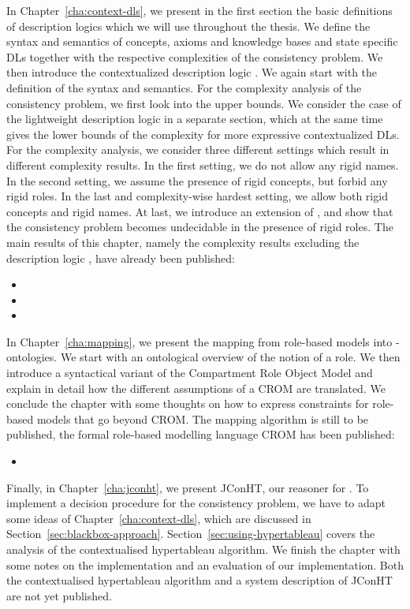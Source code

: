 In Chapter~\ref{cha:context-dls}, we present in the first section the basic definitions of
description logics which we will use throughout the thesis. We define the syntax and semantics of
concepts, axioms and knowledge bases and state specific DLs together with the respective
complexities of the consistency problem.
%
We then introduce the contextualized description logic \LMLO. We again start with the definition of
the syntax and semantics. For the complexity analysis of the consistency problem, we first look into
the upper bounds. We consider the case of the lightweight description logic \EL in a separate
section, which at the same time gives the lower bounds of the complexity for more expressive
contextualized DLs. For the complexity analysis, we consider three different settings which result in
different complexity results. In the first setting, we do not allow any rigid names.  In the
second setting, we assume the presence of rigid concepts, but forbid any rigid roles. In the
last and complexity-wise hardest setting, we allow both rigid concepts and rigid names.
%
At last, we introduce an extension of \LMLO, and show that the consistency problem becomes
undecidable in the presence of rigid roles. The main results of this chapter, namely the complexity
results excluding the description logic \SHOIQ, have already been published:
\begin{itemize}
\item {}
\item {}
\item {}
\end{itemize}


In Chapter~\ref{cha:mapping}, we present the mapping from role-based models into
\LMLO-ontologies. We start with an ontological overview of the notion of a role.  We then introduce
a syntactical variant of the Compartment Role Object Model and explain in detail how the different
assumptions of a CROM are translated.  We conclude the chapter with some thoughts on how to express
constraints for role-based models that go beyond CROM. The mapping algorithm is still to be
published, the formal role-based modelling language CROM has been published:
\begin{itemize}
\item {}
\end{itemize}


Finally, in Chapter~\ref{cha:jconht}, we present JConHT, our reasoner for \LMLO. To implement a decision
procedure for the consistency problem, we have to adapt some ideas of Chapter~\ref{cha:context-dls},
which are discussed in Section~\ref{sec:blackbox-approach}. Section~\ref{sec:using-hypertableau}
covers the analysis of the contextualised hypertableau algorithm. We finish the chapter with some
notes on the implementation and an evaluation of our implementation. Both the contextualised
hypertableau algorithm and a system description
of JConHT are not yet published.


